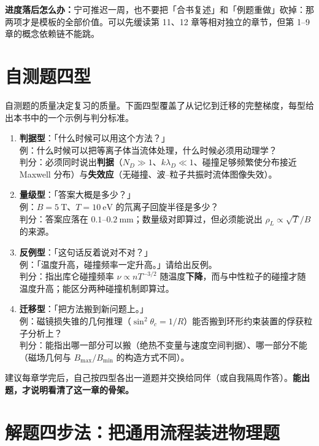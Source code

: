 \textbf{进度落后怎么办：}宁可推迟一周，也不要把「合书复述」和「例题重做」砍掉：那两项才是模板的全部价值。可以先缓读第 11、12 章等相对独立的章节，但第 1--9 章的概念依赖链不能跳。


\section{自测题四型}

自测题的质量决定复习的质量。下面四型覆盖了从记忆到迁移的完整梯度，每型给出本书中的一个示例与判分标准。

\begin{enumerate}
\item \textbf{判据型}：「什么时候可以用这个方法？」\\
例：什么时候可以把等离子体当流体处理，什么时候必须用动理学？\\
判分：必须同时说出\textbf{判据}（$N_D\gg 1$、$k\lambda_D\ll 1$、碰撞足够频繁使分布接近 Maxwell 分布）与\textbf{失效应}（无碰撞、波--粒子共振时流体图像失效）。

\item \textbf{量级型}：「答案大概是多少？」\\
例：$B=5\ \mathrm{T}$、$T=10\ \mathrm{eV}$ 的氘离子回旋半径是多少？\\
判分：答案应落在 $0.1$--$0.2\ \mathrm{mm}$；数量级对即算过，但必须能说出 $\rho_L\propto\sqrt{T}/B$ 的来源。

\item \textbf{反例型}：「这句话反着说对不对？」\\
例：「温度升高，碰撞频率一定升高。」请给出反例。\\
判分：指出库仑碰撞频率 $\nu\propto nT^{-3/2}$ 随温度\textbf{下降}，而与中性粒子的碰撞才随温度升高；能区分两种碰撞机制即算过。

\item \textbf{迁移型}：「把方法搬到新问题上。」\\
例：磁镜损失锥的几何推理（$\sin^2\theta_c=1/R$）能否搬到环形约束装置的俘获粒子分析上？\\
判分：能指出哪一部分可以搬（绝热不变量与速度空间判据）、哪一部分不能（磁场几何与 $B_{\max}/B_{\min}$ 的构造方式不同）。
\end{enumerate}

建议每章学完后，自己按四型各出一道题并交换给同伴（或自我隔周作答）。\textbf{能出题，才说明看清了这一章的骨架。}


\section{解题四步法：把通用流程装进物理题}

